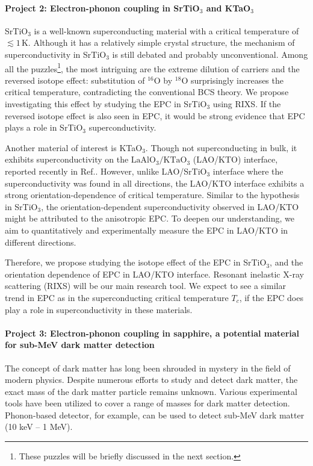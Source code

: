 \documentclass[11pt]{article}
\begin{document}
\paragraph{Project 2: Electron-phonon coupling in SrTiO$_{3}$ and KTaO$_{3}$} 
SrTiO$_{3}$ is a well-known superconducting material with a critical temperature of $\lesssim 1\, \mathrm{K}$\cite{schooley_superconductivity_1964,lin_fermi_2013}. 
Although it has a  relatively simple crystal structure, the mechanism of superconductivity in SrTiO$_{3}$ is still debated and probably unconventional. 
Among all the puzzles\footnote{These puzzles will be briefly discussed in the next section.}, the most intriguing are the extreme dilution of carriers and the reversed isotope effect: substitution of ${}^{16}\mathrm{O}$ by ${}^{18}\mathrm{O}$ surprisingly increases the critical temperature, contradicting the conventional BCS theory\cite{stucky_isotope_2016}. 
We propose investigating this effect by studying the EPC in SrTiO$_{3}$ using RIXS. If the reversed isotope effect is also seen in EPC, it would be strong evidence that EPC plays a role in SrTiO$_{3}$ superconductivity.

Another material of interest is KTaO$_{3}$. Though not superconducting in bulk, it exhibits superconductivity on the $\mathrm{LaAlO_{3}/KTaO_{3}}$ (LAO/KTO) interface, reported recently in Ref.\cite{ren_two-dimensional_2022}. 
However, unlike LAO/SrTiO$_{3}$ interface where the superconductivity was found in all directions, the LAO/KTO interface exhibits a strong orientation-dependence of critical temperature\cite{ren_two-dimensional_2022,chen_two-dimensional_2021}. Similar to the hypothesis in SrTiO$_{3}$, the orientation-dependent superconductivity observed in LAO/KTO might be attributed to the anisotropic EPC. 
To deepen our understanding, we aim to quantitatively and experimentally measure the EPC in LAO/KTO in different directions. 

Therefore, we propose studying the isotope effect of the EPC in SrTiO$_{3}$, and the orientation dependence of EPC in LAO/KTO interface. 
Resonant inelastic X-ray scattering (RIXS) will be our main research tool. 
We expect to see a similar trend in EPC as in the superconducting critical temperature $T_{c}$, if the EPC does play a role in superconductivity in these materials.

\paragraph{Project 3: Electron-phonon coupling in sapphire, a potential material for sub-MeV dark matter detection}
The concept of dark matter has long been shrouded in mystery in the field of modern physics. 
Despite numerous efforts to study and detect dark matter\cite{bergstrom_non-baryonic_2000,vogel_dark_2014,essig_first_2012,davidson_updated_2000}, the exact mass of the dark matter particle remains unknown. 
Various experimental tools have been utilized to cover a range of masses for dark matter detection. 
Phonon-based detector, for example, can be used to detect sub-MeV dark matter (10 keV -- 1 MeV)\cite{griffin_directional_2018}.
  
\end{document}
